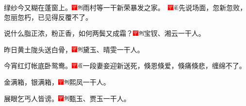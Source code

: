 绿纱今又糊在蓬窗上。{\includegraphics[width=3mm]{../Images/00002}\includegraphics[width=3mm]{../Images/00011}\footnotesize \kaishu 雨村等一干新荣暴发之家。　\includegraphics[width=3mm]{../Images/00002}\includegraphics[width=3mm]{../Images/00010}\footnotesize \kaishu 先说场面，忽新忽败，忽丽忽朽，已见得反覆不了。}

说什么脂正浓，粉正香，如何两鬓又成霜？{\includegraphics[width=3mm]{../Images/00002}\includegraphics[width=3mm]{../Images/00011}\footnotesize \kaishu 宝钗、湘云一干人。}

昨日黄土陇头送白骨，{\includegraphics[width=3mm]{../Images/00002}\includegraphics[width=3mm]{../Images/00011}\footnotesize \kaishu 黛玉、晴雯一干人。}

今宵红灯帐底卧鸳鸯。{\includegraphics[width=3mm]{../Images/00002}\includegraphics[width=3mm]{../Images/00010}\footnotesize \kaishu 一段妻妾迎新送死，倏恩倏爱，倏痛倏悲，缠绵不了。}

金满箱，银满箱，{\includegraphics[width=3mm]{../Images/00002}\includegraphics[width=3mm]{../Images/00011}\footnotesize \kaishu 熙凤一干人。}

展眼乞丐人皆谤。{\includegraphics[width=3mm]{../Images/00002}\includegraphics[width=3mm]{../Images/00011}\footnotesize \kaishu 甄玉、贾玉一干人。}

